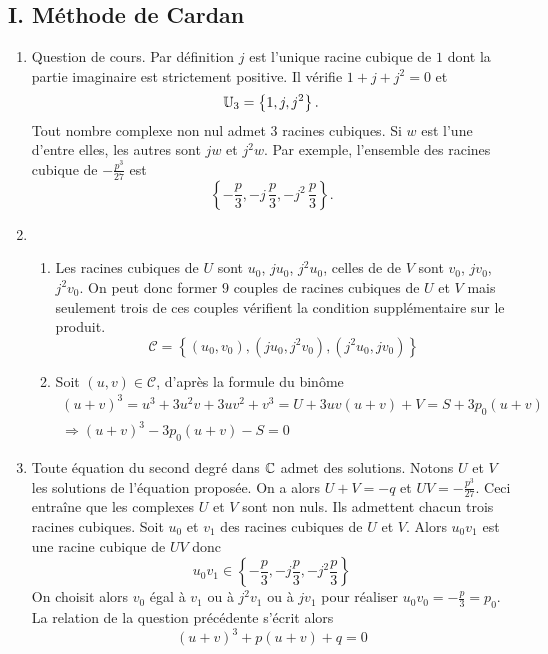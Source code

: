 \subsection*{I. Méthode de Cardan}
\begin{enumerate}
 \item Question de cours. Par définition $j$ est l'unique racine cubique de $1$ dont la partie imaginaire est strictement positive. Il vérifie $1+j+j^2 = 0$ et
\[
 \mathbb{U}_3 = \left\lbrace 1, j, j^2\right\rbrace. 
\]
Tout nombre complexe non nul admet 3 racines cubiques. Si $w$ est l'une d'entre elles, les autres sont $jw$ et $j^2w$. Par exemple, l'ensemble des racines cubique de $-\frac{p^3}{27}$ est
\[
 \left\lbrace -\frac{p}{3}, -j\,\frac{p}{3},-j^2\,\frac{p}{3}\right\rbrace .
\]

 \item
\begin{enumerate}
 \item Les racines cubiques de $U$ sont $u_0$, $ju_0$, $j^2u_0$, celles de de $V$ sont $v_0$, $jv_0$, $j^2v_0$. On peut donc former $9$ couples de racines cubiques de $U$ et $V$ mais seulement trois de ces couples vérifient la condition supplémentaire sur le produit.
\begin{displaymath}
 \mathcal{C} = \left\lbrace (u_0,v_0), (ju_0,j^2v_0), (j^2u_0,jv_0)\right\rbrace 
\end{displaymath}

 \item Soit $(u,v)\in \mathcal{C}$, d'après la formule du binôme
\begin{multline*}
 (u+v)^3 = u^3 + 3u^2v + 3uv^2 + v^3 = U +3uv(u+v) + V = S +3p_0(u+v)\\
\Rightarrow
(u+v)^3  -3p_0(u+v) -S=0
\end{multline*}
\end{enumerate}
 
 \item Toute équation du second degré dans $\mathbb{C}$ admet des solutions. Notons $U$ et $V$ les solutions de l'équation proposée. On a alors $U+V = -q$ et $UV = -\frac{p^3}{27}$. Ceci entraîne que les complexes $U$ et $V$ sont non nuls. Ils admettent chacun trois racines cubiques. Soit $u_0$ et $v_1$ des racines cubiques de $U$ et $V$. Alors $u_0v_1$ est une racine cubique de $UV$ donc
\begin{displaymath}
 u_0v_1 \in \left\lbrace -\frac{p}{3}, -j\frac{p}{3}, -j^2\frac{p}{3}\right\rbrace 
\end{displaymath}
 On choisit alors $v_0$ égal à $v_1$ ou à $j^2v_1$ ou à $jv_1$ pour réaliser $u_0v_0= -\frac{p}{3}=p_0$. La relation de la question précédente s'écrit alors
\begin{displaymath}
 (u+v)^3  +p(u+v) +q=0
\end{displaymath}



\end{enumerate}
